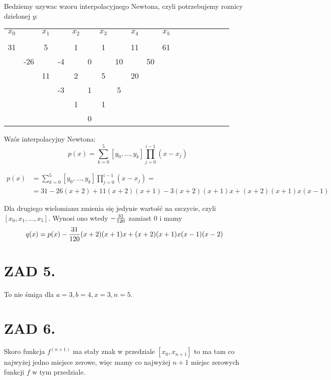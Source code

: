 \documentclass{article}[16pt]
\begin{document}
Bedziemy uzywac wzoru interpolacyjnego Newtona, czyli potrzebujemy roznicy dzielonej $y$:
\begin{center}
\begin{tabular} {c c c c c c c c c c c c c c c c c c}
    $x_0$ & & $x_1$ & & $x_2$ & & $x_3$ & & $x_4$ & & $x_5$\\
    & \\
    31 & & 5 & & 1 & & 1 & & 11 & & 61\\
    & -26 & & -4 && 0 & & 10 & & 50\\
    & & 11 & & 2 & & 5 & & 20\\
    & & & -3 & & 1 & & 5\\
    & & & & 1 & & 1\\
    & & & & & 0
\end{tabular}
\end{center}

Wzór interpolacyjny Newtona:
$$p(x)=\sum\limits_{k=0}^5[y_0,...,y_k]\prod\limits_{j=0}^{i-1}(x-x_j)$$

\begin{align*}
    p(x)&=\sum\limits_{k=0}^5[y_0,...,y_k]\prod\limits_{j=0}^{i-1}(x-x_j)=\\
    &=31 -26(x+2)+11(x+2)(x+1)-3(x+2)(x+1)x+(x+2)(x+1)x(x-1)
\end{align*}

Dla drugiego wielomianu zmienia się jedynie wartość na szczycie, czyli $[x_0,x_1,...,x_5]$. Wynosi ono wtedy $-{31\over120}$ zamiast $0$ i mamy
\begin{align*}
    q(x)&=p(x)-{31\over120}(x+2)(x+1)x+(x+2)(x+1)x(x-1)(x-2)
\end{align*}


\section*{ZAD 5.}

To nie śmiga dla $a=3, b=4,x=3,n=5$.

\section*{ZAD 6.}

Skoro funkcja $f^{(n+1)}$ ma stały znak w przedziale $[x_0,x_{n+1}]$ to ma tam co najwyżej jedno miejsce zerowe, więc mamy co najwyżej $n+1$ miejsc zerowych funkcji $f$ w tym przedziale.
\end{document}
